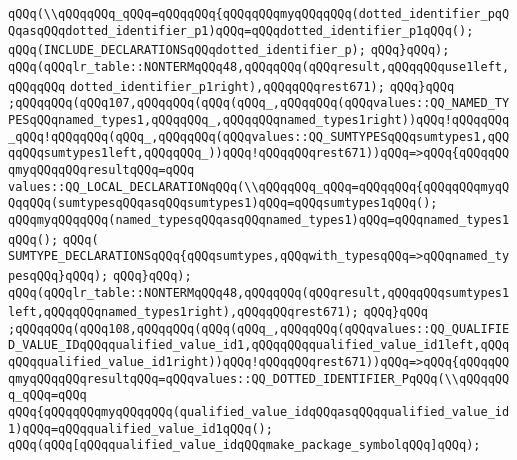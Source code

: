 \verb|qQQq(\\qQQqqQQq_qQQq=qQQqqQQq{qQQqqQQqmyqQQqqQQq(dotted_identifier_pqQQqasqQQqdotted_identifier_p1)qQQq=qQQqdotted_identifier_p1qQQq();|\newline
\verb|qQQq(INCLUDE_DECLARATIONSqQQqdotted_identifier_p);|\newline
\verb|qQQq}qQQq);|\newline
\verb|qQQq(qQQqlr_table::NONTERMqQQq48,qQQqqQQq(qQQqresult,qQQqqQQquse1left,qQQqqQQq|\newline
\verb|dotted_identifier_p1right),qQQqqQQqrest671);|\newline
\verb|qQQq}qQQq|\newline
\verb|;qQQqqQQq(qQQq107,qQQqqQQq(qQQq(qQQq_,qQQqqQQq(qQQqvalues::QQ_NAMED_TYPESqQQqnamed_types1,qQQqqQQq_,qQQqqQQqnamed_types1right))qQQq!qQQqqQQq_qQQq!qQQqqQQq(qQQq_,qQQqqQQq(qQQqvalues::QQ_SUMTYPESqQQqsumtypes1,qQQqqQQqsumtypes1left,qQQqqQQq_))qQQq!qQQqqQQqrest671))qQQq=>qQQq{qQQqqQQqmyqQQqqQQqresultqQQq=qQQq|\newline
\verb|values::QQ_LOCAL_DECLARATIONqQQq(\\qQQqqQQq_qQQq=qQQqqQQq{qQQqqQQqmyqQQqqQQq(sumtypesqQQqasqQQqsumtypes1)qQQq=qQQqsumtypes1qQQq();|\newline
\verb|qQQqmyqQQqqQQq(named_typesqQQqasqQQqnamed_types1)qQQq=qQQqnamed_types1qQQq();|\newline
\verb|qQQq(|\newline
\verb|SUMTYPE_DECLARATIONSqQQq{qQQqsumtypes,qQQqwith_typesqQQq=>qQQqnamed_typesqQQq}qQQq);|\newline
\verb|qQQq}qQQq);|\newline
\verb|qQQq(qQQqlr_table::NONTERMqQQq48,qQQqqQQq(qQQqresult,qQQqqQQqsumtypes1left,qQQqqQQqnamed_types1right),qQQqqQQqrest671);|\newline
\verb|qQQq}qQQq|\newline
\verb|;qQQqqQQq(qQQq108,qQQqqQQq(qQQq(qQQq_,qQQqqQQq(qQQqvalues::QQ_QUALIFIED_VALUE_IDqQQqqualified_value_id1,qQQqqQQqqualified_value_id1left,qQQqqQQqqualified_value_id1right))qQQq!qQQqqQQqrest671))qQQq=>qQQq{qQQqqQQqmyqQQqqQQqresultqQQq=qQQqvalues::QQ_DOTTED_IDENTIFIER_PqQQq(\\qQQqqQQq_qQQq=qQQq|\newline
\verb|qQQq{qQQqqQQqmyqQQqqQQq(qualified_value_idqQQqasqQQqqualified_value_id1)qQQq=qQQqqualified_value_id1qQQq();|\newline
\verb|qQQq(qQQq[qQQqqualified_value_idqQQqmake_package_symbolqQQq]qQQq);|\newline
